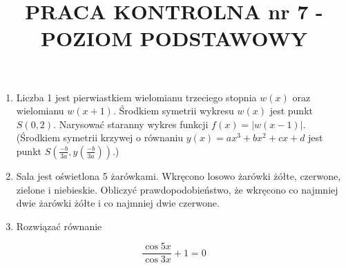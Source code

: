 \documentclass[10pt]{article}
\title{PRACA KONTROLNA nr 7 - POZIOM PODSTAWOWY }
\author{}
\date{}
\begin{document}
\maketitle
\begin{enumerate}
  \item Liczba 1 jest pierwiastkiem wielomianu trzeciego stopnia $w(x)$ oraz wielomianu $w(x+1)$. Środkiem symetrii wykresu $w(x)$ jest punkt $S(0,2)$. Narysować staranny wykres funkcji $f(x)=|w(x-1)|$. (Środkiem symetrii krzywej o równaniu $y(x)=a x^{3}+b x^{2}+c x+d$ jest punkt $S\left(\frac{-b}{3 a}, y\left(\frac{-b}{3 a}\right)\right)$.)
  \item Sala jest oświetlona 5 żarówkami. Wkręcono losowo żarówki żółte, czerwone, zielone i niebieskie. Obliczyć prawdopodobieństwo, że wkręcono co najmniej dwie żarówki żółte i co najmniej dwie czerwone.
  \item Rozwiązać równanie
\end{enumerate}

$$
\frac{\cos 5 x}{\cos 3 x}+1=0
$$
\end{document}
